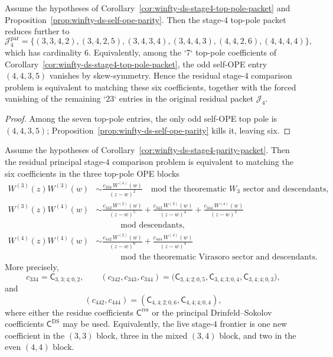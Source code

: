 \begin{corollary}
\label{cor:winfty-ds-stage4-parity-packet}
Assume the hypotheses of
Corollary~\ref{cor:winfty-ds-stage4-top-pole-packet} and
Proposition~\ref{prop:winfty-ds-self-ope-parity}.  Then the stage-$4$
top-pole packet reduces further to
\[
\mathcal{J}_4^{\mathrm{par}}
=\{(3,3,4,2),(3,4,2,5),(3,4,3,4),(3,4,4,3),
(4,4,2,6),(4,4,4,4)\},
\]
which has cardinality $6$.  Equivalently, among the `7` top-pole
coefficients of
Corollary~\ref{cor:winfty-ds-stage4-top-pole-packet}, the odd self-OPE
entry $(4,4,3,5)$ vanishes by skew-symmetry.  Hence the residual
stage-$4$ comparison problem is equivalent to matching these six
coefficients, together with the forced vanishing of the remaining `23`
entries in the original residual packet $\mathcal{J}_4$.
\end{corollary}

\begin{proof}
Among the seven top-pole entries, the only odd self-OPE top pole is $(4,4,3,5)$; Proposition~\ref{prop:winfty-ds-self-ope-parity} kills it, leaving six.
\end{proof}

\begin{corollary}
\label{cor:winfty-ds-stage4-ope-blocks}
Assume the hypotheses of
Corollary~\ref{cor:winfty-ds-stage4-parity-packet}.  Then the residual
principal stage-$4$ comparison problem is equivalent to matching the
six coefficients in the three top-pole OPE blocks
\begin{align*}
W^{(3)}(z)W^{(3)}(w)
&\sim
\frac{c_{334}\,W^{(4)}(w)}{(z-w)^2}
\quad\text{mod the theorematic $W_3$ sector and descendants},\\
W^{(3)}(z)W^{(4)}(w)
&\sim
\frac{c_{342}\,W^{(2)}(w)}{(z-w)^5}
+\frac{c_{343}\,W^{(3)}(w)}{(z-w)^4}
+\frac{c_{344}\,W^{(4)}(w)}{(z-w)^3}\\
&\qquad
\quad\text{mod descendants},\\
W^{(4)}(z)W^{(4)}(w)
&\sim
\frac{c_{442}\,W^{(2)}(w)}{(z-w)^6}
+\frac{c_{444}\,W^{(4)}(w)}{(z-w)^4}\\
&\qquad
\quad\text{mod the theorematic Virasoro sector and descendants}.
\end{align*}
More precisely,
\[
c_{334}=\mathsf{C}_{3,3;4;0,2},
\qquad
(c_{342},c_{343},c_{344})
\!=\!
\bigl(
\mathsf{C}_{3,4;2;0,5},
\mathsf{C}_{3,4;3;0,4},
\mathsf{C}_{3,4;4;0,3}
\bigr),
\]
and
\[
(c_{442},c_{444})
=(\mathsf{C}_{4,4;2;0,6},\mathsf{C}_{4,4;4;0,4}),
\]
where either the residue coefficients
$\mathsf{C}^{\mathrm{res}}$ or the principal Drinfeld--Sokolov
coefficients $\mathsf{C}^{\mathrm{DS}}$ may be used.  Equivalently, the
live stage-$4$ frontier is one new coefficient in the $(3,3)$ block,
three in the mixed $(3,4)$ block, and two in the even $(4,4)$ block.
\end{corollary}

